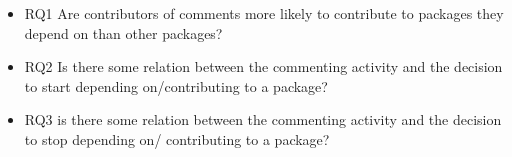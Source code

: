 \begin{itemize}
\item RQ1 Are contributors of comments more likely to contribute to packages they depend on  than other packages?
\item RQ2 Is there some relation between the commenting activity and the decision to start depending on/contributing to a package?
\item RQ3 is there some relation between the commenting activity and the decision to stop depending on/ contributing to a package?
\end{itemize}
